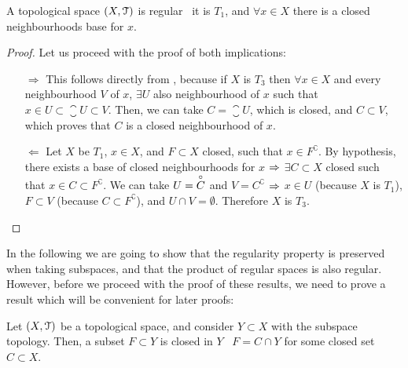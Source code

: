 \begin{theorem}
	\label{th:regular-space-characterisation-2}
	A topological space $(X, \EuScript{T})$ is regular \iff\ it is $T_1$, and $\forall x\in X$ there is a closed neighbourhoods base for $x$.
\end{theorem}

\begin{proof}
Let us proceed with the proof of both implications:
	\begin{itemize}
		\item[$\boxed{\Rightarrow}$] This follows directly from , because if $X$ is $T_3$ then $\forall x\in X$ and every neighbourhood $V$ of $x$, $\exists U$ also neighbourhood of $x$ such that $x\in U\subset \closure{U}\subset V$. Then, we can take $C=\closure{U}$, which is closed, and $C\subset V$, which proves that $C$ is a closed neighbourhood of $x$.
		\item[$\boxed{\Leftarrow}$] Let $X$ be $T_1$, $x\in X$, and $F\subset X$ closed, such that $x\in F^\complement$. By hypothesis, there exists a base of closed neighbourhoods for $x$ $\Rightarrow$ $\exists C\subset X$ closed such that $x\in C\subset F^\complement$.
		We can take $U=\overset{\circ}{C}$ and $V=C^\complement$ $\Rightarrow$ $x\in U$ (because $X$ is $T_1$), $F\subset V$ (because $C\subset F^\complement$), and $U\cap V =\emptyset$. Therefore $X$ is $T_3$.
	\end{itemize}
\end{proof}

In the following we are going to show that the regularity property is preserved when taking subspaces, and that the product of regular spaces is also regular.
However, before we proceed with the proof of these results, we need to prove a result which will be convenient for later proofs:

\begin{lemma}
	\label{lem:subspace-closed-sets}
	Let $(X, \EuScript{T})$ be a topological space, and consider $Y\subset X$ with the subspace topology. Then, a subset $F\subset Y$ is closed in $Y$ \iff\ $F=C\cap Y$ for some closed set $C\subset X$.
\end{lemma}

